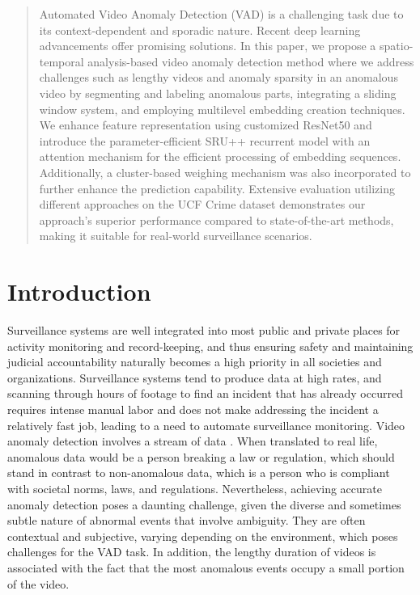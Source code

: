 \documentclass[runningheads]{llncs}
\begin{document}
\begin{abstract}
Automated Video Anomaly Detection (VAD) is a challenging task due to its context-dependent and sporadic nature. Recent deep learning advancements offer promising solutions. In this paper, we propose a spatio-temporal analysis-based video anomaly detection method where we address challenges such as lengthy videos and anomaly sparsity in an anomalous video by segmenting and labeling anomalous parts, integrating a sliding window system, and employing multilevel embedding creation techniques. We enhance feature representation using customized ResNet50 and introduce the parameter-efficient SRU++ recurrent model with an attention mechanism for the efficient processing of embedding sequences. Additionally, a cluster-based weighing mechanism was also incorporated to further enhance the prediction capability. Extensive evaluation utilizing different approaches on the UCF Crime dataset demonstrates our approach's superior performance compared to state-of-the-art methods, making it suitable for real-world surveillance scenarios.

\end{abstract}

\section{Introduction}

Surveillance systems are well integrated into most public and private places for activity monitoring and record-keeping, and thus ensuring safety and maintaining judicial accountability naturally becomes a high priority in all societies and organizations. Surveillance systems tend to produce data at high rates, and scanning through hours of footage to find an incident that has already occurred requires intense manual labor and does not make addressing the incident a relatively fast job, leading to a need to automate surveillance monitoring. Video anomaly detection involves a stream of data \cite{sertis}. When translated to real life, anomalous data would be a person breaking a law or regulation, which should stand in contrast to non-anomalous data, which is a person who is compliant with societal norms, laws, and regulations. Nevertheless, achieving accurate anomaly detection poses a daunting challenge, given the diverse and sometimes subtle nature of abnormal events that involve ambiguity. They are often contextual and subjective, varying depending on the environment, which poses challenges for the VAD task. In addition, the lengthy duration of videos is associated with the fact that the most anomalous events occupy a small portion of the video. \cite{Multi-contextual} \cite{Memory-Token} \cite{zhao2022exploiting}
\end{document}
